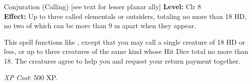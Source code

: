 {Conjuration (Calling) [see text for lesser planar ally]}
{
	\textbf{Level:}
	Clr 8\\
	\textbf{Effect:}
	Up to three called elementals or outsiders, totaling no more than 18 HD, no two of which can be more than 9 m apart when they appear.\\
}
{
	This spell functions like , except that you may call a single creature of 18 HD or less, or up to three creatures of the same kind whose Hit Dice total no more than 18. The creatures agree to help you and request your return payment together.

	\textit{XP Cost}:
	500 XP.

}

